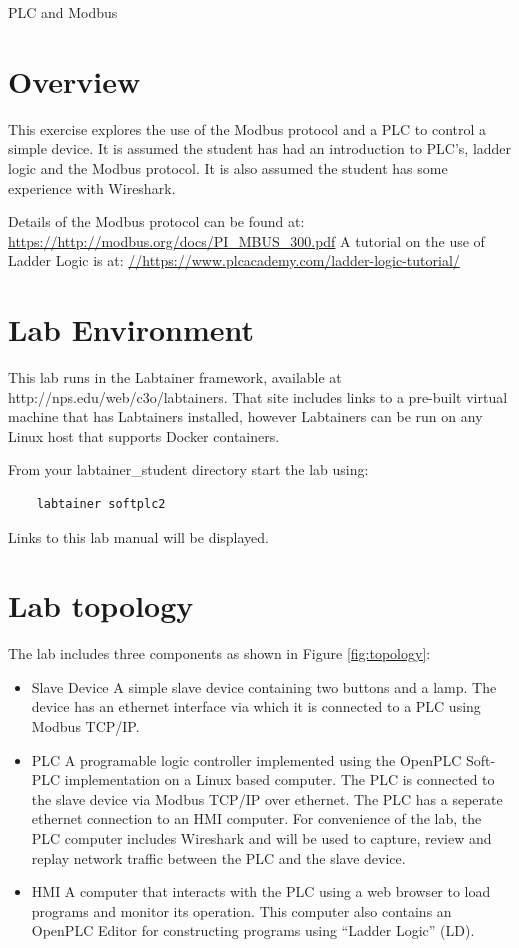


\begin{center}
{\LARGE PLC and Modbus}
\vspace{0.1in}\\
\end{center}


\section{Overview}
This exercise explores the use of the Modbus protocol and a
PLC to control a simple device.
It is assumed the student has had an introduction to PLC's, ladder logic and 
the Modbus protocol.  It is also assumed the student has some experience with
Wireshark.

Details of the Modbus protocol can be found at:
\url {https://http://modbus.org/docs/PI\_MBUS\_300.pdf}
A tutorial on the use of Ladder Logic is at:
\url {//https://www.plcacademy.com/ladder-logic-tutorial/}


\section{Lab Environment}
This lab runs in the Labtainer framework,
available at http://nps.edu/web/c3o/labtainers.
That site includes links to a pre-built virtual machine
that has Labtainers installed, however Labtainers can
be run on any Linux host that supports Docker containers.

From your labtainer_student directory start the lab using:
\begin{verbatim}
    labtainer softplc2
\end{verbatim}
Links to this lab manual will be displayed.  

\section{Lab topology}
The lab includes three components as shown in Figure \ref{fig:topology}:
\begin{itemize}
\item{Slave Device} A simple slave device containing two buttons and a lamp.  The device has an
ethernet interface via which it is connected to a PLC using Modbus TCP/IP.
\item{PLC} A programable logic controller implemented using the OpenPLC Soft-PLC implementation
on a Linux based computer.  The PLC is connected to the slave device via Modbus TCP/IP over ethernet.
The PLC has a seperate ethernet connection to an HMI computer.
For convenience of the lab, the PLC computer includes Wireshark and will be used to capture, review and
replay network traffic between the PLC and the slave device.  

\item{HMI} A computer that interacts with the PLC using a web browser to load programs and monitor its operation.  This
computer also contains an OpenPLC Editor for constructing programs using ``Ladder Logic'' (LD).
\end{itemize}

